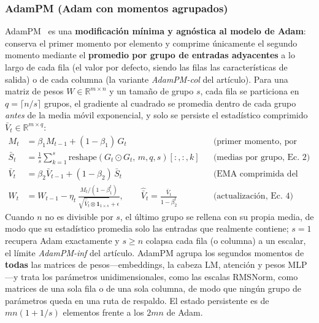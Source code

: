 \subsubsection{AdamPM (Adam con momentos agrupados)}
AdamPM~\citep{ji_adampm_2026} es una \textbf{modificación mínima y agnóstica al
modelo de Adam}: conserva el primer momento por elemento y comprime únicamente
el segundo momento mediante el \textbf{promedio por grupo de entradas
adyacentes} a lo largo de cada fila (el valor por defecto, siendo las filas las
características de salida) o de cada columna (la variante \emph{AdamPM-col} del
artículo). Para una matriz de pesos $W \in \mathbb{R}^{m \times n}$ y un tamaño
de grupo $s$, cada fila se particiona en $q = \lceil n/s \rceil$ grupos, el
gradiente al cuadrado se promedia dentro de cada grupo \emph{antes} de la media
móvil exponencial, y solo se persiste el estadístico comprimido
$\bar{V}_t \in \mathbb{R}^{m \times q}$:
\begin{align}
M_t &= \beta_1 M_{t-1} + (1-\beta_1)\, G_t
     && \text{(primer momento, por elemento, Ec.~1)} \\
\bar{S}_t &= \frac{1}{s}\sum_{k=1}^{s}
     \mathrm{reshape}(G_t \odot G_t,\, m, q, s)[:,:,k]
     && \text{(medias por grupo, Ec.~2)} \\
\bar{V}_t &= \beta_2 \bar{V}_{t-1} + (1-\beta_2)\, \bar{S}_t
     && \text{(EMA comprimida del segundo momento, Ec.~3)} \\
W_t &= W_{t-1} - \eta_t \,
     \frac{M_t/(1-\beta_1^t)}
          {\sqrt{\hat{\bar{V}}_t \otimes \mathbf{1}_{1\times s}} + \epsilon},
\qquad \hat{\bar{V}}_t = \frac{\bar{V}_t}{1-\beta_2^t}
     && \text{(actualización, Ec.~4)}
\end{align}
Cuando $n$ no es divisible por $s$, el último grupo se rellena con su propia
media, de modo que su estadístico promedia solo las entradas que realmente
contiene; $s{=}1$ recupera Adam exactamente y $s \ge n$ colapsa cada fila (o
columna) a un escalar, el límite \emph{AdamPM-inf} del artículo. AdamPM agrupa
los segundos momentos de \textbf{todas} las matrices de pesos---embeddings, la
cabeza LM, atención y pesos MLP---y trata los parámetros unidimensionales, como
las escalas RMSNorm, como matrices de una sola fila o de una sola columna, de
modo que ningún grupo de parámetros queda en una ruta de respaldo. El estado
persistente es de $mn(1+1/s)$ elementos frente a los $2mn$ de Adam.

